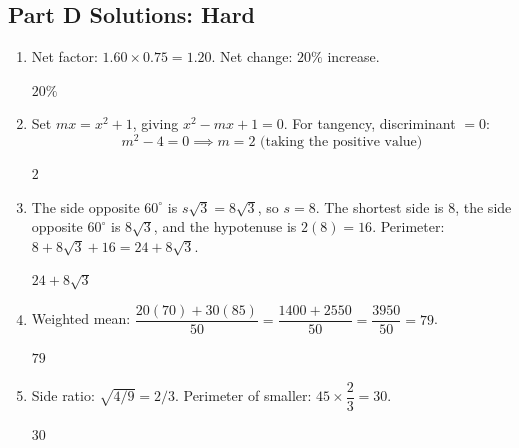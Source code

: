 \documentclass[14pt]{extarticle}
\begin{document}
\subsection*{Part D Solutions: Hard}
\begin{enumerate}
  \item Net factor: \(1.60 \times 0.75 = 1.20\). Net change: \(20\%\) increase.

  \(\boxed{20\%}\)

  \item Set \(mx = x^2 + 1\), giving \(x^2 - mx + 1 = 0\). For tangency, discriminant \(= 0\):
  \[
  m^2 - 4 = 0 \implies m = 2 \text{ (taking the positive value)}
  \]

  \(\boxed{2}\)

  \item The side opposite \(60^\circ\) is \(s\sqrt{3} = 8\sqrt{3}\), so \(s = 8\). The shortest side is 8, the side opposite \(60^\circ\) is \(8\sqrt{3}\), and the hypotenuse is \(2(8) = 16\). Perimeter: \(8 + 8\sqrt{3} + 16 = 24 + 8\sqrt{3}\).

  \(\boxed{24 + 8\sqrt{3}}\)

  \item Weighted mean: \(\dfrac{20(70) + 30(85)}{50} = \dfrac{1400 + 2550}{50} = \dfrac{3950}{50} = 79\).

  \(\boxed{79}\)

  \item Side ratio: \(\sqrt{4/9} = 2/3\). Perimeter of smaller: \(45 \times \dfrac{2}{3} = 30\).

  \(\boxed{30}\)
\end{enumerate}

\end{document}
